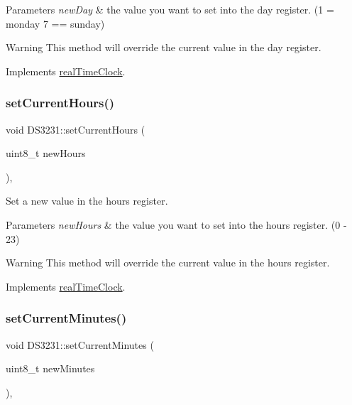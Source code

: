 \begin{DoxyParams}{Parameters}
{\em new\+Day} & the value you want to set into the day register. (1 = monday 7 == sunday) \\
\hline
\end{DoxyParams}
\begin{DoxyWarning}{Warning}
This method will override the current value in the day register. 
\end{DoxyWarning}


Implements \mbox{\hyperlink{classreal_time_clock_a4a80a695cbb55860921f92509fae0cd0}{real\+Time\+Clock}}.

\mbox{\label{class_d_s3231_ae59c15abcccd8e27eadebcd150db810e}} 
\subsubsection{\texorpdfstring{set\+Current\+Hours()}{setCurrentHours()}}
{\footnotesize\ttfamily void D\+S3231\+::set\+Current\+Hours (\begin{DoxyParamCaption}\item[{uint8\+\_\+t}]{new\+Hours }\end{DoxyParamCaption})\hspace{0.3cm}{\ttfamily [override]}, {\ttfamily [virtual]}}



Set a new value in the hours register. 


\begin{DoxyParams}{Parameters}
{\em new\+Hours} & the value you want to set into the hours register. (0 -\/ 23) \\
\hline
\end{DoxyParams}
\begin{DoxyWarning}{Warning}
This method will override the current value in the hours register. 
\end{DoxyWarning}


Implements \mbox{\hyperlink{classreal_time_clock_a515d9de6067ae563bff5217da5100a23}{real\+Time\+Clock}}.

\mbox{\label{class_d_s3231_a221f92091b813108b3515f6676be29c8}} 
\subsubsection{\texorpdfstring{set\+Current\+Minutes()}{setCurrentMinutes()}}
{\footnotesize\ttfamily void D\+S3231\+::set\+Current\+Minutes (\begin{DoxyParamCaption}\item[{uint8\+\_\+t}]{new\+Minutes }\end{DoxyParamCaption})\hspace{0.3cm}{\ttfamily [override]}, {\ttfamily [virtual]}}




